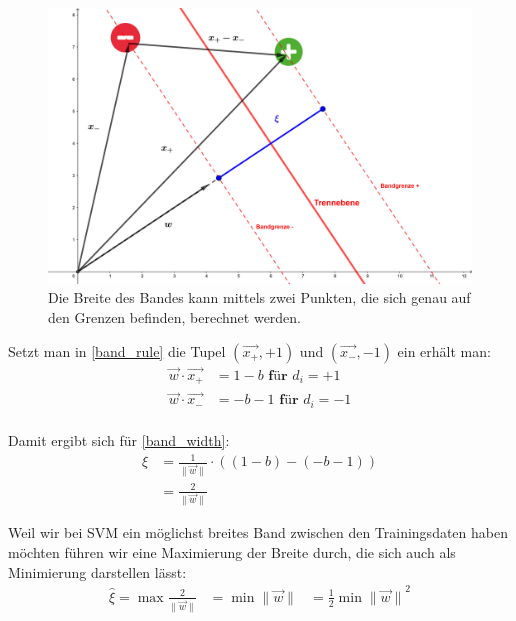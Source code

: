 \documentclass[a4paper,11pt,twoside]{scrreprt}
\begin{document}
\begin{figure}[H]
	\centering
	\includegraphics{assets/bandbreite.png}
	\caption{Die Breite des Bandes kann mittels zwei Punkten, die sich genau auf den Grenzen befinden, berechnet werden.}
	\label{fig:bandbreite}
\end{figure}



Setzt man in \autoref{band_rule} die Tupel $(\vec{x_{+}}, +1)$ und $(\vec{x_{-}}, -1)$ ein erhält man:
\begin{equation} \label{band_width_x}
    \begin{aligned}
     \vec{w} \cdot \vec{x_{+}} &= 1 -b \textbf{ für $d_{i} = +1$}\\
     \vec{w} \cdot \vec{x_{-}} &= -b -1 \textbf{ für $d_{i} = -1$}\\
    \end{aligned}
\end{equation}

Damit ergibt sich für \autoref{band_width}:
\begin{equation} \label{band_width_final}
    \begin{aligned}
    \xi &= \frac{1}{\lVert \vec{w} \rVert} \cdot ((1-b) - (-b-1)) \\
    &= \frac{2}{\lVert \vec{w} \rVert}
    \end{aligned}
\end{equation}

Weil wir bei \ac{SVM} ein möglichst breites Band zwischen den Trainingsdaten haben möchten führen wir eine Maximierung der Breite durch, die sich auch als Minimierung darstellen lässt:
\begin{equation} \label{band_width_max}
    \begin{aligned}
    \hat{\xi} = \max \frac{2}{\lVert \vec{w} \rVert} &= \min {\lVert \vec{w} \rVert} &= \frac{1}{2} \min {\lVert \vec{w} \rVert}^{2}
    \end{aligned}
\end{equation}
\end{document}
